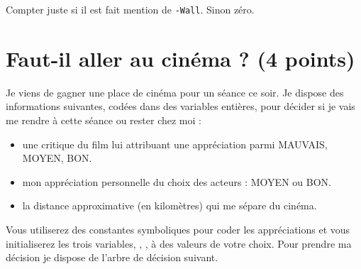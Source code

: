 \begin{baremeenv}
Compter juste si il est fait mention de \verb+-Wall+. Sinon zéro.  
\end{baremeenv}


\section{Faut-il aller au cinéma ? (4 points)}

Je viens de gagner une place de cinéma pour un séance ce soir. Je dispose des informations suivantes, codées dans des variables entières, pour décider si je vais me rendre à cette séance ou rester chez moi :
\begin{itemize}
\item {} une critique du film lui attribuant une appréciation parmi MAUVAIS, MOYEN, BON.
\item {} mon appréciation personnelle du choix des acteurs : MOYEN ou BON.
\item {} la distance approximative (en kilomètres) qui me sépare du cinéma.
\end{itemize}
Vous utiliserez des constantes symboliques pour coder les appréciations et vous initialiserez les trois variables, , ,  à des valeurs de votre choix. Pour prendre ma décision je dispose de l'arbre de décision suivant. 


